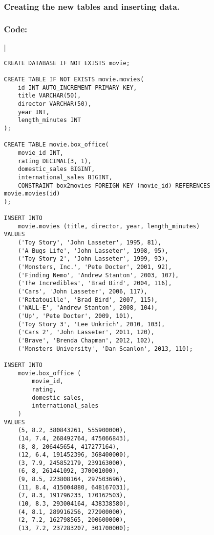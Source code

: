 \documentclass[12pt]{article}
\begin{document}
\subsubsection*{Creating the new tables and inserting data.}
\subsubsection*{Code:}
\vfill
\begin{multicols}{2}{|}
    \begin{verbatim}
CREATE DATABASE IF NOT EXISTS movie;

CREATE TABLE IF NOT EXISTS movie.movies(
    id INT AUTO_INCREMENT PRIMARY KEY,
    title VARCHAR(50),
    director VARCHAR(50),
    year INT,
    length_minutes INT
);

CREATE TABLE movie.box_office(
    movie_id INT,
    rating DECIMAL(3, 1),
    domestic_sales BIGINT,
    international_sales BIGINT,
    CONSTRAINT box2movies FOREIGN KEY (movie_id) REFERENCES movie.movies(id)
);

INSERT INTO
    movie.movies (title, director, year, length_minutes)
VALUES
    ('Toy Story', 'John Lasseter', 1995, 81),
    ('A Bugs Life', 'John Lasseter', 1998, 95),
    ('Toy Story 2', 'John Lasseter', 1999, 93),
    ('Monsters, Inc.', 'Pete Docter', 2001, 92),
    ('Finding Nemo', 'Andrew Stanton', 2003, 107),
    ('The Incredibles', 'Brad Bird', 2004, 116),
    ('Cars', 'John Lasseter', 2006, 117),
    ('Ratatouille', 'Brad Bird', 2007, 115),
    ('WALL-E', 'Andrew Stanton', 2008, 104),
    ('Up', 'Pete Docter', 2009, 101),
    ('Toy Story 3', 'Lee Unkrich', 2010, 103),
    ('Cars 2', 'John Lasseter', 2011, 120),
    ('Brave', 'Brenda Chapman', 2012, 102),
    ('Monsters University', 'Dan Scanlon', 2013, 110);

INSERT INTO
    movie.box_office (
        movie_id,
        rating,
        domestic_sales,
        international_sales
    )
VALUES
    (5, 8.2, 380843261, 555900000),
    (14, 7.4, 268492764, 475066843),
    (8, 8, 206445654, 417277164),
    (12, 6.4, 191452396, 368400000),
    (3, 7.9, 245852179, 239163000),
    (6, 8, 261441092, 370001000),
    (9, 8.5, 223808164, 297503696),
    (11, 8.4, 415004880, 648167031),
    (7, 8.3, 191796233, 170162503),
    (10, 8.3, 293004164, 438338580),
    (4, 8.1, 289916256, 272900000),
    (2, 7.2, 162798565, 200600000),
    (13, 7.2, 237283207, 301700000);
    \end{verbatim}
\end{multicols}
\end{document}

